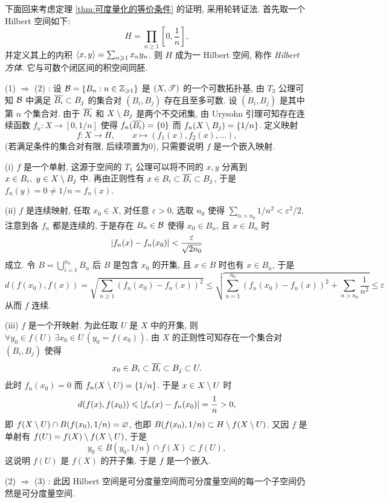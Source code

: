     下面回来考虑定理 \ref{thm:可度量化的等价条件} 的证明, 采用轮转证法. 首先取一个 Hilbert 空间如下:
    \[
        H=\prod_{n\geqslant 1}\left[0,\frac{1}{n}\right],
    \]
    并定义其上的内积 $ \lrangle{x,y}=\sum_{n\geqslant 1}x_ny_n $. 则 $ H $ 成为一 Hilbert 空间, 称作 \emph{Hilbert 方体}. 它与可数个闭区间的积空间同胚.

    (1) $ \Rightarrow $ (2) : 设 $ \CB=\set{B_n : n\in\Zi} $ 是 $ (X,\ST) $ 的一个可数拓扑基, 由 $ T_3 $ 公理可知 $ \CB $ 中满足 $ \baro{B_i}\subset B_j $ 的集合对 $ (B_i,B_j) $ 存在且至多可数. 设 $ (B_i,B_j) $ 是其中第 $ n $ 个集合对. 由于 $ \baro{B_i} $ 和 $ X\sm B_j $ 是两个不交闭集, 由 Urysohn 引理可知存在连续函数 $ f_n : X\to[0,1/n] $ 使得 $ f_n(\baro{B_i})=\set{0} $ 而 $ f_n(X\sm B_j)=\set{1/n} $. 定义映射
    \[
        f : X\to H,\qquad x\mapsto(f_1(x), f_2(x),\dots),
    \]
    (若满足条件的集合对有限, 后续项置为0), 只需要说明 $ f $ 是一个嵌入映射.

    (i) $ f $ 是一个单射, 这源于空间的 $ T_1 $ 公理可以将不同的 $ x,y $ 分离到 $ x\in B_i,\ y\in X\sm B_j $ 中. 再由正则性有 $ x\in B_i\subset\baro{B_i}\subset B_j $, 于是 $ f_n(y)=0\ne 1/n=f_n(x) $.

    (ii) $ f $ 是连续映射, 任取 $ x_0\in X $, 对任意 $ \varepsilon>0 $, 选取 $ n_0 $ 使得 $ \sum_{n>n_0}1/n^2<\varepsilon^2/2 $. 注意到各 $ f_n $ 都是连续的, 于是存在 $ B_n\in\CB $ 使得 $ x_0\in B_n $, 且 $ x\in B_n $ 时
    \[
        \abs{f_n(x)-f_n(x_0)}<\frac{\varepsilon}{\sqrt{2n_0}}
    \]
    成立. 令 $ B=\bigcup_{i=1}^{n_0}B_n $ 后 $ B $ 是包含 $ x_0 $ 的开集, 且 $ x\in B $ 时也有 $ x\in B_n $, 于是
    \[
        d(f(x_0),f(x))=\sqrt{\sum_{n\geqslant 1}(f_n(x_0)-f_n(x))^2}\leqslant\sqrt{\sum_{n=1}^{n_0}(f_n(x_0)-f_n(x))^2+\sum_{n>n_0}\frac{1}{n^2}}\leqslant\varepsilon
    \]
    从而 $ f $ 连续.

    (iii) $ f $ 是一个开映射. 为此任取 $ U $ 是 $ X $ 中的开集, 则 $ \forall y_0\in f(U)\,\exists x_0\in U\,(y_0=f(x_0)) $. 由 $ X $ 的正则性可知存在一个集合对 $ (B_i,B_j) $ 使得
    \[
        x_0\in B_i\subset\baro{B_i}\subset B_j\subset U.
    \]
    此时 $ f_n(x_0)=0 $ 而 $ f_n(X\sm U)=\set{1/n} $. 于是 $ x\in X\sm U $ 时
    \[
        d(f(x),f(x_0))\leqslant\abs{f_n(x)-f_n(x_0)}=\frac{1}{n}>0,
    \]
    即 $ f(X\sm U)\cap B(f(x_0),1/n)=\varnothing $, 也即 $ B(f(x_0),1/n)\subset H\sm f(X\sm U) $. 又因 $ f $ 是单射有 $ f(U)=f(X)\sm f(X\sm U) $, 于是
    \[
        y_0\in B(y_0,1/n)\cap f(X)\subset f(U),
    \]
    这说明 $ f(U) $ 是 $ f(X) $ 的开子集. 于是 $ f $ 是一个嵌入.

    (2) $ \Rightarrow $ (3) : 此因 Hilbert 空间是可分度量空间而可分度量空间的每一个子空间仍然是可分度量空间.

